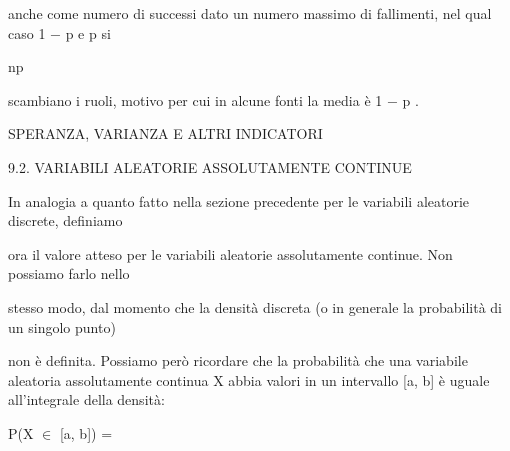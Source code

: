 \documentclass[a4paper,portrait,12pt]{article}
\begin{document}
\begin{flushleft}
anche come numero di successi dato un numero massimo di fallimenti, nel qual caso 1 $-$ p e p si
\end{flushleft}


\begin{flushleft}
np
\end{flushleft}


\begin{flushleft}
scambiano i ruoli, motivo per cui in alcune fonti la media \`{e} 1 $-$ p .
\end{flushleft}










\begin{flushleft}
SPERANZA, VARIANZA E ALTRI INDICATORI
\end{flushleft}





\begin{flushleft}
9.2. VARIABILI ALEATORIE ASSOLUTAMENTE CONTINUE
\end{flushleft}


\begin{flushleft}
In analogia a quanto fatto nella sezione precedente per le variabili aleatorie discrete, definiamo
\end{flushleft}


\begin{flushleft}
ora il valore atteso per le variabili aleatorie assolutamente continue. Non possiamo farlo nello
\end{flushleft}


\begin{flushleft}
stesso modo, dal momento che la densit\`{a} discreta (o in generale la probabilit\`{a} di un singolo punto)
\end{flushleft}


\begin{flushleft}
non \`{e} definita. Possiamo per\`{o} ricordare che la probabilit\`{a} che una variabile aleatoria assolutamente continua X abbia valori in un intervallo [a, b] \`{e} uguale all'integrale della densit\`{a}:
\end{flushleft}


\begin{flushleft}
P(X $\in$ [a, b]) =
\end{flushleft}
\end{document}
